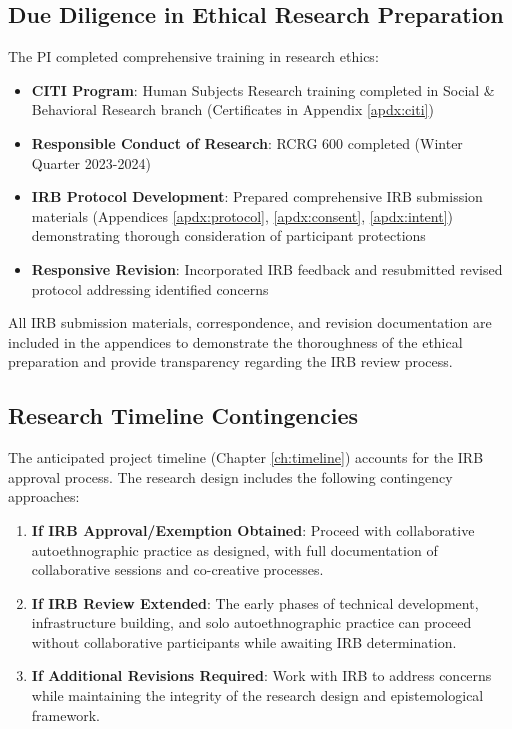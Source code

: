 \subsection*{Due Diligence in Ethical Research Preparation} 

The PI completed comprehensive training in research ethics: 

\begin{itemize}[noitemsep]
	\item \textbf{CITI Program}: Human Subjects Research training completed in Social \& Behavioral Research branch (Certificates in Appendix \ref{apdx:citi}) 
	\item \textbf{Responsible Conduct of Research}: RCRG 600 completed (Winter Quarter 2023-2024) 
	\item \textbf{IRB Protocol Development}: Prepared comprehensive IRB submission materials (Appendices \ref{apdx:protocol}, \ref{apdx:consent}, \ref{apdx:intent}) demonstrating thorough consideration of participant protections
	\item \textbf{Responsive Revision}: Incorporated IRB feedback and resubmitted revised protocol addressing identified concerns
\end{itemize} 

All IRB submission materials, correspondence, and revision documentation are included in the appendices to demonstrate the thoroughness of the ethical preparation and provide transparency regarding the IRB review process. 

\subsection*{Research Timeline Contingencies}

The anticipated project timeline (Chapter \ref{ch:timeline}) accounts for the IRB approval process. The research design includes the following contingency approaches:

\begin{enumerate}[noitemsep]
	\item \textbf{If IRB Approval/Exemption Obtained}: Proceed with collaborative autoethnographic practice as designed, with full documentation of collaborative sessions and co-creative processes.
	
	\item \textbf{If IRB Review Extended}: The early phases of technical development, infrastructure building, and solo autoethnographic practice can proceed without collaborative participants while awaiting IRB determination.
	
	\item \textbf{If Additional Revisions Required}: Work with IRB to address concerns while maintaining the integrity of the research design and epistemological framework.
\end{enumerate}
